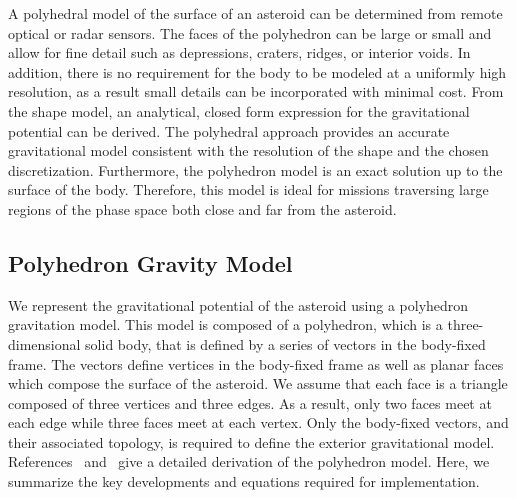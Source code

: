 A polyhedral model of the surface of an asteroid can be determined from remote optical or radar sensors.
The faces of the polyhedron can be large or small and allow for fine detail such as depressions, craters, ridges, or interior voids.
In addition, there is no requirement for the body to be modeled at a uniformly high resolution, as a result small details can be incorporated with minimal cost.
From the shape model, an analytical, closed form expression for the gravitational potential can be derived.
The polyhedral approach provides an accurate gravitational model consistent with the resolution of the shape and the chosen discretization.
Furthermore, the polyhedron model is an exact solution up to the surface of the body.
Therefore, this model is ideal for missions traversing large regions of the phase space both close and far from the asteroid.

\subsection{Polyhedron Gravity Model}\label{sec:polyhedron_model}

We represent the gravitational potential of the asteroid using a polyhedron gravitation model.
This model is composed of a polyhedron, which is a three-dimensional solid body, that is defined by a series of vectors in the body-fixed frame.
The vectors define vertices in the body-fixed frame as well as planar faces which compose the surface of the asteroid.
We assume that each face is a triangle composed of three vertices and three edges.
As a result, only two faces meet at each edge while three faces meet at each vertex.
Only the body-fixed vectors, and their associated topology, is required to define the exterior gravitational model.
References~\cite{werner1994} and~\cite{werner1996} give a detailed derivation of the polyhedron model.
Here, we summarize the key developments and equations required for implementation.


